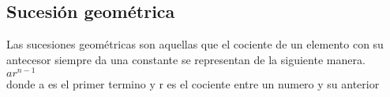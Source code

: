 \subsection{Sucesión geométrica}
Las sucesiones geométricas son aquellas que el cociente de un elemento con su antecesor siempre da una constante se representan de la siguiente manera.
\\$ ar^{n-1}$
\\donde a es el primer termino y r es el cociente entre un numero y su anterior
